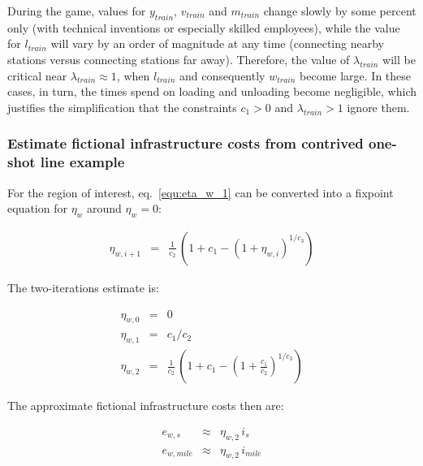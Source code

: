 \documentclass[12pt]{article}
\begin{document}
During the game, values for $y_\mathit{train}$, $v_\mathit{train}$ and $m_\mathit{train}$ change slowly by some percent only (with technical inventions or especially skilled employees), while the value for $l_\mathit{train}$ will vary by an order of magnitude at any time (connecting nearby stations versus connecting stations far away). Therefore, the value of $\lambda_\mathit{train}$ will be critical near $\lambda_\mathit{train} \approx 1$, when $l_\mathit{train}$ and consequently $w_\mathit{train}$ become large. In these cases, in turn, the times spend on loading and unloading become negligible, which justifies the simplification that the constraints $c_1 > 0$ and $\lambda_\mathit{train} > 1$ ignore them.

\subsubsection{Estimate fictional infrastructure costs from contrived one-shot line example}

For the region of interest, eq.~\ref{equ:eta_w_1} can be converted into a fixpoint equation for $\eta_w$ around $\eta_w=0$:

\begin{eqnarray}
\eta_{w,i+1} &=& \frac{1}{c_2}\,\left( 1 + c_1 - \left(1 + \eta_{w,i}\right)^{1/c_3}\right)
\end{eqnarray}

The two-iterations estimate is:

\begin{eqnarray}
\eta_{w,0} &=& 0 \\
\eta_{w,1} &=& c_1 / c_2 \\
\eta_{w,2} &=& \frac{1}{c_2}\,\left( 1 + c_1 - \left(1 + \frac{c_1}{c_2}\right)^{1/c_3}\right)
\end{eqnarray}

The approximate fictional infrastructure costs then are:

\begin{eqnarray}
e_{w,s} &\approx & \eta_{w,2} \, i_s \\
e_{w,\mathit{mile}} &\approx & \eta_{w,2} \, i_\mathit{mile}
\end{eqnarray}
\end{document}
